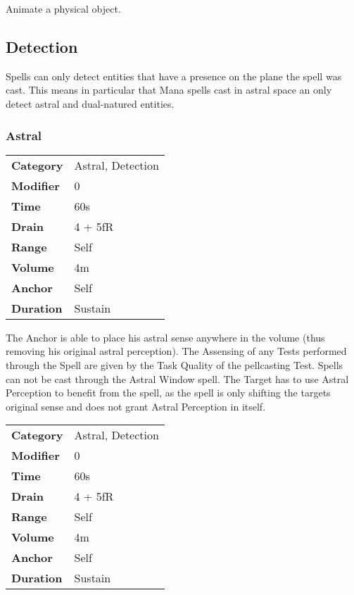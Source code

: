 \hfil

Animate a physical object.

\subsection{Detection}

Spells can only detect entities that have a presence on the plane the
spell was cast. This means in particular that Mana spells cast in astral
space an only detect astral and dual-natured entities.

\subsubsection{Astral}


\begin{tabular}{ll}
    \textbf{Category} & Astral, Detection \\
    \textbf{Modifier} & 0                 \\
    \textbf{Time}     & 60s               \\
    \textbf{Drain}    & 4 + 5fR           \\
    \textbf{Range}    & Self              \\
    \textbf{Volume}   & 4m                \\
    \textbf{Anchor}   & Self              \\
    \textbf{Duration} & Sustain           \\
\end{tabular}


The Anchor is able to place his astral sense anywhere in the volume
(thus removing his original astral
perception). The Assensing of any Tests
performed through the Spell are given by the Task
Quality of the
pellcasting Test. Spells
can not be cast through the Astral Window spell. The Target has to use
Astral Perception to benefit from the
spell, as the spell is only shifting the targets original sense and does
not grant Astral Perception in itself.


\begin{tabular}{ll}
    \textbf{Category} & Astral, Detection \\
    \textbf{Modifier} & 0                 \\
    \textbf{Time}     & 60s               \\
    \textbf{Drain}    & 4 + 5fR           \\
    \textbf{Range}    & Self              \\
    \textbf{Volume}   & 4m                \\
    \textbf{Anchor}   & Self              \\
    \textbf{Duration} & Sustain           \\
\end{tabular}

